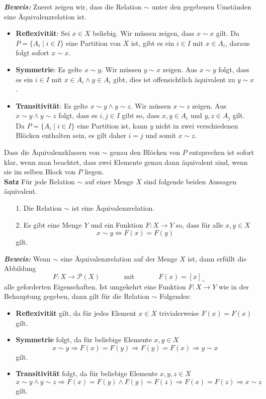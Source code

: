 \textbf{\textit{Beweis: }} 
Zuerst zeigen wir, dass die Relation $\sim$ unter den gegebenen Umständen eine Äquivalenzrelation ist.
    \begin{itemize}
    \item \textbf{Reflexivität}: Sei $x\in X$  beliebig. Wir müssen zeigen, dass $x\sim x$ gilt. Da $P=\{A_i\mid i\in I\}$ eine Partition von $X$ ist, gibt es ein $i\in I$ mit $x\in A_i$, daraus folgt sofort $x\sim x$.
    \item \textbf{Symmetrie}: Es gelte $x\sim y$. Wir müssen $y\sim x$ zeigen. Aus $x\sim y$ folgt, dass es ein $i\in I$ mit $x\in A_i\land y\in A_i$ gibt, dies ist offensichtlich äquivalent zu $y\sim x$.
    \item \textbf{Transitivität}: Es gelte $x\sim y\land y\sim z$. Wir müssen $x\sim z$ zeigen. Aus $x\sim y\land y\sim z$ folgt, dass es $i,j\in I$ gibt so, dass $x,y\in A_i$ und $y,z\in A_j$ gilt. Da $P=\{A_i\mid i\in I\}$ eine Partition ist, kann $y $ nicht in zwei verschiedenen Blöcken enthalten sein, es gilt daher $i=j$ und somit $x\sim z$.
    \end{itemize}
    Dass die Äquivalenzklassen von $\sim$ genau den Blöcken von $P$ entsprechen ist sofort klar, wenn man beachtet, dass
    zwei Elemente genau dann äquivalent sind, wenn sie im selben Block von $P$ liegen.\\
\textbf{Satz }
Für jede Relation $\sim$ auf einer Menge $X$ sind folgende beiden Aussagen äquivalent.
    \begin{enumerate}
    \item[1.] Die Relation $\sim$ ist eine Äquivalenzrelation.
    \item[2.] Es gibt eine Menge $Y$ und ein Funktion $F:X\to Y$ so, dass für alle $x,y\in X$
    \[
    x\sim y\Leftrightarrow F(x)=F(y)
    \]
    gilt.
    \end{enumerate}
\textbf{\textit{Beweis: }} 
 Wenn $\sim$ eine Äquivalenzrelation auf der Menge $X$ ist, dann erfüllt die Abbildung
    \[
    F:X\to\mathcal{P}(X)\phantom{abstand}\text{mit} \phantom{abstand} F(x)=[x]_\sim
    \]
    alle geforderten Eigenschaften. Ist umgekehrt eine Funktion $F:X\to Y$ wie in der Behauptung gegeben, dann gilt für die Relation $\sim$ Folgendes:
    \begin{itemize}
    \item\textbf{Reflexivität} gilt, da für jedes Element $x\in X$ trivialerweise $F(x)=F(x)$ gilt.
    \item \textbf{Symmetrie} folgt, da für beliebige Elemente $x,y\in X$
    \[
    x\sim y\Rightarrow F(x)=F(y)\Rightarrow F(y)=F(x)\Rightarrow y\sim x
    \]
    gilt.
    \item\textbf{Transitivität} folgt, da für beliebige Elemente $x,y,z\in X$
    \[
    x\sim y\land y\sim z\Rightarrow F(x)=F(y)\land F(y)=F(z)\Rightarrow F(x)=F(z)\Rightarrow  x\sim z
    \]
    gilt.
    \end{itemize}


